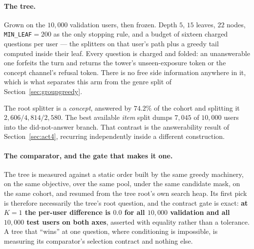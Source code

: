 \documentclass[11pt]{article}
\begin{document}
\paragraph{The tree.} Grown on the $10{,}000$ validation users, then frozen. Depth $5$, $15$ leaves,
$22$ nodes, \texttt{MIN\_LEAF}${}={}200$ as the only stopping rule, and a budget of sixteen charged
questions per user --- the splitters on that user's path plus a greedy tail computed inside their
leaf. Every question is charged and folded: an unanswerable one forfeits the turn and returns the
tower's unseen-exposure token or the concept channel's refusal token. There is no free side
information anywhere in it, which is what separates this arm from the genre split of
Section~\ref{sec:groupgreedy}.

The root splitter is a \emph{concept}, answered by $74.2\%$ of the cohort and splitting it
$2{,}606 / 4{,}814 / 2{,}580$. The best available \emph{item} split dumps $7{,}045$ of $10{,}000$
users into the did-not-answer branch. That contrast is the answerability result of
Section~\ref{sec:act4}, recurring independently inside a different construction.

\paragraph{The comparator, and the gate that makes it one.} The tree is measured against a static
order built by the same greedy machinery, on the same objective, over the same pool, under the same
candidate mask, on the same cohort, and resumed from the tree root's own search heap. Its first pick
is therefore necessarily the tree's root question, and the contract gate is exact: \textbf{at $K{=}1$
the per-user difference is $0.0$ for all $10{,}000$ validation and all $10{,}000$ test users on both
axes}, asserted with equality rather than a tolerance. A tree that ``wins'' at one question, where
conditioning is impossible, is measuring its comparator's selection contract and nothing else.
\end{document}
